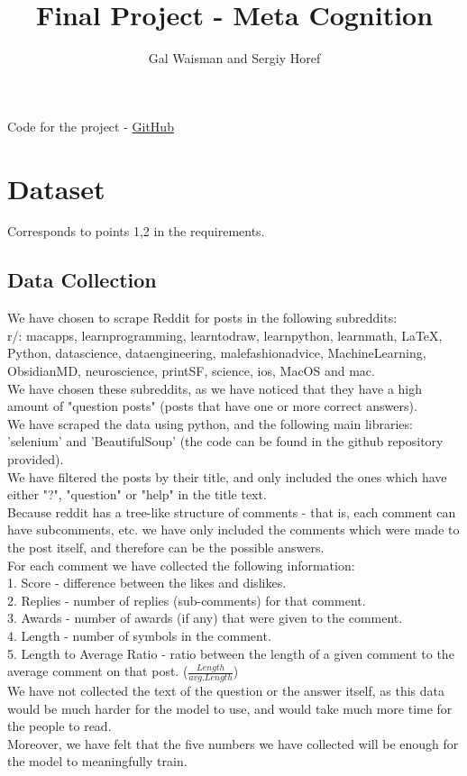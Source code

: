 \documentclass[11pt, oneside]{article}   	%
\title{Final Project - Meta Cognition}
\author{Gal Waisman and Sergiy Horef}
\begin{document}
\maketitle
\begin{center}
	Code for the project - \href{https://github.com/Horef/mc_final}{GitHub}
\end{center}

\tableofcontents

\newpage
\section{Dataset}
Corresponds to points 1,2 in the requirements.
\subsection{Data Collection}
We have chosen to scrape Reddit for posts in the following subreddits:\\
r/: macapps, learnprogramming, learntodraw, learnpython, learnmath, LaTeX, Python, datascience, dataengineering, malefashionadvice, MachineLearning, ObsidianMD, neuroscience, printSF, science, ios, MacOS and mac.\\
We have chosen these subreddits, as we have noticed that they have a high amount of "question posts" (posts that have one or more correct answers).\\

We have scraped the data using python, and the following main libraries: 'selenium' and 'BeautifulSoup' (the code can be found in the github repository provided).\\
We have filtered the posts by their title, and only included the ones which have either "?", "question" or "help" in the title text.\\
Because reddit has a tree-like structure of comments - that is, each comment can have subcomments, etc. we have only included the comments which were made to the post itself, and therefore can be the possible answers.\\

For each comment we have collected the following information:\\
1. Score - difference between the likes and dislikes.\\
2. Replies - number of replies (sub-comments) for that comment.\\
3. Awards - number of awards (if any) that were given to the comment.\\
4. Length - number of symbols in the comment.\\
5. Length to Average Ratio - ratio between the length of a given comment to the average comment on that post. ($\frac{Length}{avg.Length}$)\\
We have not collected the text of the question or the answer itself, as this data would be much harder for the model to use, and would take much more time for the people to read.\\
Moreover, we have felt that the five numbers we have collected will be enough for the model to meaningfully train.\\
\end{document}
